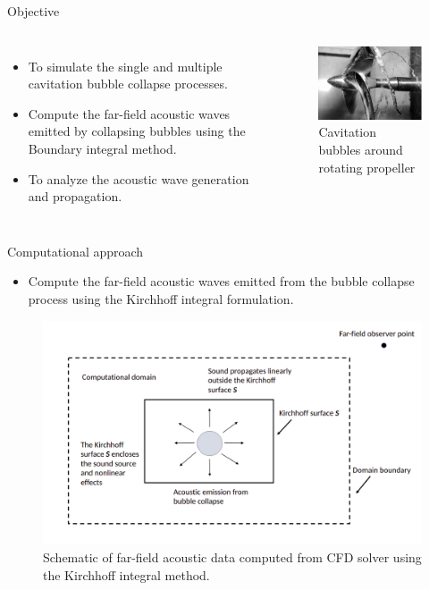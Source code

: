 \documentclass[10pt, aspectratio=169]{beamer}
\begin{document}
\begin{frame}{Objective}
	\begin{columns}

	\begin{itemize}
		\item To simulate the single and multiple cavitation bubble collapse processes.
		\item Compute the far-field acoustic waves emitted by collapsing bubbles using the Boundary integral method.
		\item To analyze the acoustic wave generation and propagation.
	\end{itemize}
				
		\begin{figure}[h]
			\includegraphics[scale = 0.55]{images/propeller.png}
			\caption*{Cavitation bubbles around rotating propeller\cite{propeller}}	
		\end{figure}
							
	\end{columns}
\end{frame}

\begin{frame}{Computational approach}
	
	\begin{itemize}
		\item Compute the far-field acoustic waves emitted from the bubble collapse process using the Kirchhoff integral formulation.
	\end{itemize}

	\begin{figure}
		\centering
		\includegraphics[scale=0.22]{images/shematic1.png}
		\caption*{Schematic of far-field acoustic data computed from CFD solver using the Kirchhoff integral method.}
	\end{figure}		

\end{frame}
\end{document}
